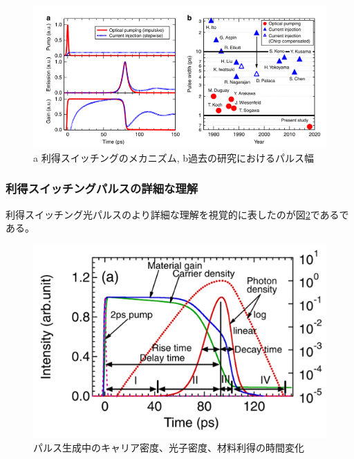 \begin{figure}[h]
	\centering
	\includegraphics[width=15cm]{figure/fig_1_1_GS_ito.png}
	\caption{a 利得スイッチングのメカニズム, b過去の研究におけるパルス幅\cite{ref_t_ito}}
	\label{fig:fig_1_1_GS_ito}
\end{figure}

\newpage
\subsubsection{利得スイッチングパルスの詳細な理解}
利得スイッチング光パルスのより詳細な理解を視覚的に表したのが図\ref{fig:fig_1_1_GS_pulse}である\cite{ref_1_1_GS}である。
\begin{figure}[ht]
	\centering
	\includegraphics[width=15cm]{figure/fig_1_1_GS_pulse.png}
	\caption{パルス生成中のキャリア密度、光子密度、材料利得の時間変化\cite{ref_1_1_GS}}
	\label{fig:fig_1_1_GS_pulse}
\end{figure}

